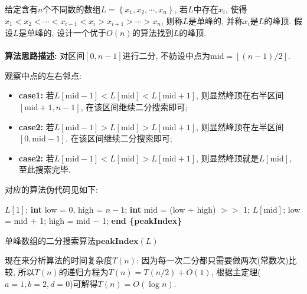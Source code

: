 \documentclass{article}
\begin{document}
\pagebreak


\begin{homeworkProblem}

	给定含有$n$个不同数的数组$L=\left\{ x_1,x_2,\cdots, x_n \right\}$, 若$L$中存在$x_i$, 使得$x_1<x_2<\cdots<x_{i-1}<x_i>x_{i+1}>\cdots >x_n$, 则称$L$是单峰的, 并称$x_i$是$L$的峰顶. 假设$L$是单峰的, 设计一个优于$O(n)$的算法找到$L$的峰顶.
	\\

	\solution
	\\

	\textbf{算法思路描述:} 对区间$[0,n-1]$进行二分, 不妨设中点为mid$=\left\lfloor (n-1)/2\right\rfloor $. 
	
	观察中点的左右邻点: 
	\begin{itemize}
		\item \textbf{case1:} 若$L\left[ \mathrm{mid}-1 \right] <L\left[ \mathrm{mid} \right] <L\left[ \mathrm{mid}+1 \right]$, 则显然峰顶在右半区间$[\text{mid} +  1, n - 1]$, 在该区间继续二分搜索即可;
		\item \textbf{case2:} 若$L\left[ \mathrm{mid}-1 \right] >L\left[ \mathrm{mid} \right] >L\left[ \mathrm{mid}+1 \right]$, 则显然峰顶在左半区间$[0, \text{mid} -  1]$, 在该区间继续二分搜索即可;
		\item \textbf{case2:} 若$L\left[ \mathrm{mid}-1 \right] <L\left[ \mathrm{mid} \right] >L\left[ \mathrm{mid}+1 \right]$, 则显然峰顶就是$L\left[ \mathrm{mid} \right]$, 至此搜索完毕.
	\end{itemize}
	对应的算法伪代码见如下:
	\begin{algorithm}[H]
		\begin{algorithmic}[1]
		 
			\State \Return $L[1]$; 
		\Else
			\State \textbf{int} low = 0, high = $n-1$;
				\State \textbf{int} mid = (low + high) $>>$ 1;
					\State \Return $L\left[ \mathrm{mid} \right]$;
					\State low = mid $+$ 1;
				\Else
					\State high = mid $-$ 1;
				\EndIf
			\EndWhile
		\EndIf
		\State \textbf{end \{peakIndex\}}
		\end{algorithmic}
		\caption{单峰数组的二分搜索算法$\textbf{peakIndex}(L)$}
		\label{alg:单峰数组的二分搜索算法}
	\end{algorithm}
	现在来分析算法的时间复杂度$T(n)$: 因为每一次二分都只需要做两次(常数次)比较, 所以$T(n)$的递归方程为$T\left( n \right) =T\left( n/2 \right) +O\left( 1 \right) $, 根据主定理($a=1,b=2,d=0$)可解得$T\left( n \right) =O\left( \log n \right) $.
\end{homeworkProblem}
\end{document}
